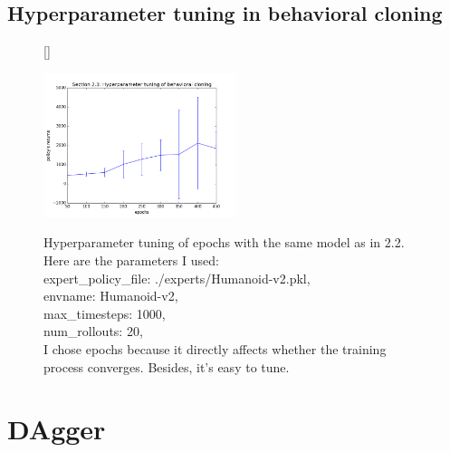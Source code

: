 \documentclass[12pt]{article}
\begin{document}
	\subsection{Hyperparameter tuning in behavioral cloning}
	\begin{figure}[!htbp] 
		[\FBwidth]
		{\caption[caption]{
				Hyperparameter tuning of epochs with the same model as in 2.2.
				Here are the parameters I used:\\ \hspace{0.5\textwidth}
				expert\_policy\_file: ./experts/Humanoid-v2.pkl,\\ \hspace{0.5\textwidth}
				envname: Humanoid-v2,\\ \hspace{0.5\textwidth}
				max\_timesteps: 1000,\\ \hspace{0.5\textwidth}
				num\_rollouts: 20,\\ \hspace{0.5\textwidth}
				I chose epochs because it directly affects whether the training process converges.  Besides, it's easy to tune.
			}\label{fig:hyper}}
		{\includegraphics[width=0.5\textwidth]{section23.png}}
	\end{figure}
	\pagebreak
	
	\section{DAgger}
\end{document}
